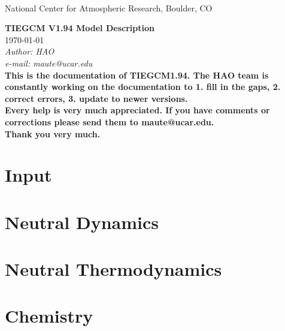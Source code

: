 \documentclass[12pt]{book}
\begin{document}
%
\begin{titlepage}
%
 \\
\noindent National Center for Atmospheric Research, Boulder, CO \\
\vspace{2in}
%
\begin{center}
{\Large\bf TIEGCM V1.94 Model Description} \\
{\today} \\
\medskip
{\it Author: HAO} \\
{\it e-mail: maute@ucar.edu\\}
\medskip
\medskip
{\bf This is the documentation of TIEGCM1.94. 
The HAO team is constantly working on the documentation to 1. fill in the gaps, 2. correct errors,
3. update to newer versions. \\
Every help is very much appreciated. If you have comments or   corrections
please send them to maute@ucar.edu.\\
Thank you very much.}
\end{center}
%
\end{titlepage}
%
\setcounter{page}{1}
%

%
\tableofcontents
\listoffigures
\listoftables
%
%
%
%
\newpage
%

\chapter{Input}


\chapter{Neutral Dynamics}


\chapter{Neutral Thermodynamics}


\chapter{Chemistry}





\end{document}
